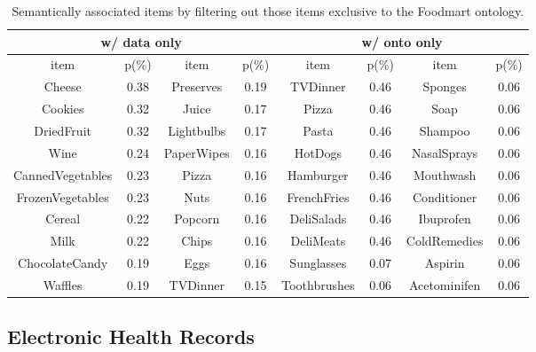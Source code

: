 

\begin{table}[tbh]\scriptsize
\begin{center}
\begin{tabular}{ c c | c c || c c | c c }
\hline
\multicolumn{4}{c||}{w/ data only}  &   \multicolumn{4}{c}{w/ onto only}\\
\hline
item	&	p(\%)	&	item	&	p(\%)	&	item	&	p(\%)	&	item	&	p(\%)	\\
\hline
Cheese	&	0.38	&	Preserves	&	0.19	&	TVDinner	&	0.46	&	Sponges	&	0.06	\\
Cookies	&	0.32	&	Juice	&	0.17	&	Pizza	&	0.46	&	Soap	&	0.06	\\
DriedFruit	&	0.32	&	Lightbulbs	&	0.17	&	Pasta	&	0.46	&	Shampoo	&	0.06	\\
Wine	&	0.24	&	PaperWipes	&	0.16	&	HotDogs	&	0.46	&	NasalSprays	&	0.06	\\
CannedVegetables	&	0.23	&	Pizza	&	0.16	&	Hamburger	&	0.46	&	Mouthwash	&	0.06	\\
FrozenVegetables	&	0.23	&	Nuts	&	0.16	&	FrenchFries	&	0.46	&	Conditioner	&	0.06	\\
Cereal	&	0.22	&	Popcorn	&	0.16	&	DeliSalads	&	0.46	&	Ibuprofen	&	0.06	\\
Milk	&	0.22	&	Chips	&	0.16	&	DeliMeats	&	0.46	&	ColdRemedies	&	0.06	\\
ChocolateCandy	&	0.19	&	Eggs	&	0.16	&	Sunglasses	&	0.07	&	Aspirin	&	0.06	\\
Waffles	&	0.19	&	TVDinner	&	0.15	&	Toothbrushes	&	0.06	&	Acetominifen	&	0.06	\\					
\hline
\end{tabular}
\end{center}
\caption{\label{tbl:foodmart_comp2} Semantically associated items by filtering out those items exclusive to the Foodmart ontology.}
\end{table}


\subsection{Electronic Health Records}
